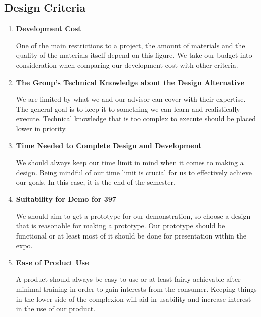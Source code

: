 \documentclass[12pt]{article}
\begin{document}
        \subsection{Design Criteria}
            \begin{enumerate}
                \item \textbf{Development Cost}
                
                One of the main restrictions to a project, the amount of materials and the quality of the materials itself depend on this figure. We take our budget into consideration when comparing our development cost with other criteria.

                \item \textbf{The Group's Technical Knowledge about the Design Alternative}
                
                We are limited by what we and our advisor can cover with their expertise. The general goal is to keep it to something we can learn and realistically execute. Technical knowledge that is too complex to execute should be placed lower in priority.

                \item \textbf{Time Needed to Complete Design and Development}
                
                We should always keep our time limit in mind when it comes to making a design. Being mindful of our time limit is crucial for us to effectively achieve our goals. In this case, it is the end of the semester.

                \item \textbf{Suitability for Demo for 397}
                
                We should aim to get a prototype for our demonstration, so choose a design that is reasonable for making a prototype. Our prototype should be functional or at least most of it should be done for presentation within the expo.

                \item \textbf{Ease of Product Use}
                
                A product should always be easy to use or at least fairly achievable after minimal training in order to gain interests from the consumer. Keeping things in the lower side of the complexion will aid in usability and increase interest in the use of our product.
            \end{enumerate}
        
\end{document}
